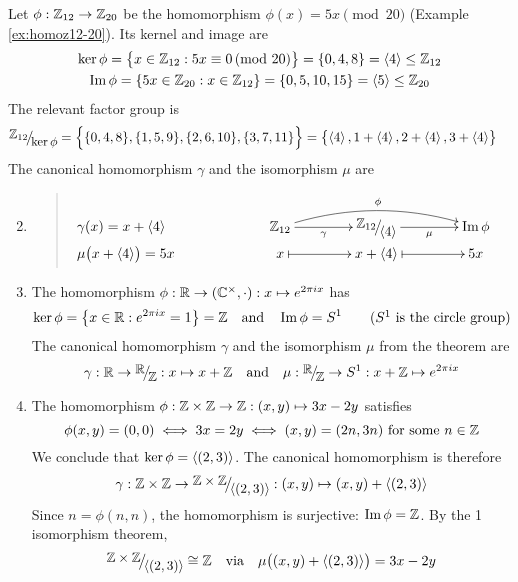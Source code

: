 \begin{examples}{}{}
	\exstart Let $\phi:\mathbb{Z}_{12}\to\mathbb{Z}_{20}$ be the homomorphism $\phi(x)=5x\!\!\pmod{20}$ (Example \ref{ex:homoz12-20}). Its kernel and image are
	\begin{gather*}
		\ker\phi
		=\bigl\{x\in\mathbb{Z}_{12}:5x\equiv 0\negthickspace\pmod{20}\bigr\}
		=\{0,4,8\}
		=\left\langle 4\right\rangle\le \mathbb{Z}_{12}\\
		\operatorname{Im}\phi=\{5x\in\mathbb{Z}_{20}:x\in\mathbb{Z}_{12}\}
		=\{0,5,10,15\}
		=\left\langle 5\right\rangle\le\mathbb{Z}_{20}
	\end{gather*}
	The relevant factor group is
	\begin{align*}
		\quotient{\Z_{12}}{\ker\phi}
		&=\Bigl\{\{0,4,8\},\{1,5,9\},\{2,6,10\},\{3,7,11\}\Bigr\}
		=\bigl\{\ip 4,1+\ip 4,2+\ip 4,3+\ip 4\bigr\}
	\end{align*}
	The canonical homomorphism $\gamma$ and the isomorphism $\mu$ are\vspace{-8pt}
	\begin{enumerate}\setcounter{enumi}{1}
	  \item[]\begin{quote}
			$\SelectTips{cm}{}\xymatrix @C40pt @R0pt{%
				\rlap{$\gamma(x)=x+\ip 4$} &&& \Z_{12} \ar@{->}[r]_-{\scriptstyle\gamma} \ar@{->}@/^12pt/[rr]^{\scriptstyle\phi} & \quotient{\Z_{12}}{\ip 4} \ar@{->}[r]_-{\scriptstyle\mu} & \image\phi\\
				\rlap{$\mu\bigl(x+\ip 4\bigr)=5x$} &&& x \ar@{|->}[r] & x+\ip 4 \ar@{|->}[r] & 5x
			}$
		\end{quote}
	  
	\item The homomorphism $\phi:\mathbb{R}\to(\mathbb{C}^\times,\cdot):x\mapsto e^{2\pi ix}$ has
  \[
  	\ker\phi=\bigl\{x\in\mathbb{R}:e^{2\pi ix}=1\bigr\} =\mathbb{Z}
  	\quad\text{and}\quad 
  	\operatorname{Im}\phi=S^1
  	\tag{$S^1$ is the circle group}
  \]
  The canonical homomorphism $\gamma$ and the isomorphism $\mu$ from the theorem are
  \[
  	\gamma:\R\to\quotient{\R}{\Z}:x\mapsto x+\Z
  	\quad\text{and}\quad
  	\mu:\quotient\R{\Z}\to S^1:x+\Z\mapsto e^{2\pi ix}
  \]
  
  \item The homomorphism $\phi:\mathbb{Z}\times\mathbb{Z}\to\mathbb{Z}:(x,y)\mapsto 3x-2y$ satisfies
  \[
  	\phi(x,y)=(0,0)\iff 3x=2y\iff (x,y)=(2n,3n)\text{ for some $n\in\mathbb{Z}$}
  \]
  We conclude that $\ker\phi=\left\langle (2,3)\right\rangle$. The canonical homomorphism is therefore
  \[
  	\gamma:\Z\times\Z\to
  	\quotient{\Z\times\Z}{\ip{(2,3)}}:
  	(x,y)\mapsto (x,y)+\ip{(2,3)}
  \]
  Since $n=\phi(n,n)$, the homomorphism is surjective: $\operatorname{Im}\phi=\mathbb{Z}$. By the 1\st{} isomorphism theorem,
  \[
  	\quotient{\Z\times\Z}{\ip{(2,3)}}\cong\Z
  	\quad\text{via}\quad 
  	\mu\bigl((x,y)+\ip{(2,3)}\bigr)=3x-2y
  \]
  

\end{enumerate}
\end{examples}
